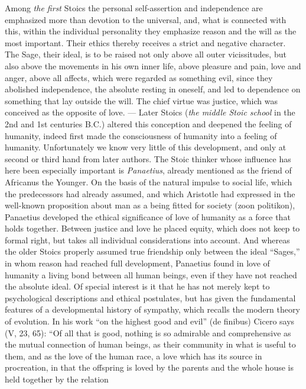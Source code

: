 \documentclass[12pt,a4paper,openany]{book}
\newcommand{\opage}[1]{\marginnote{\footnotesize\textit{[#1]}}}
\begin{document}
Among \emph{the first} Stoics the personal self-assertion
and independence are emphasized more than devotion to the universal,
and, what is connected with this, within the individual
personality they emphasize reason and the will as the
most important. Their ethics thereby receives a strict and negative character.
The Sage, their ideal, is to be raised not only above all
outer vicissitudes, but also above the movements in his own
inner life, above pleasure and pain, love and anger, above all
affects, which were regarded as something evil, since they abolished
independence, the absolute resting in oneself, and led
to dependence on something that lay outside the will.
The chief virtue was justice, which was conceived as the opposite of
love. --- Later Stoics (\emph{the middle Stoic school}
in the 2nd and 1st centuries B.C.) altered this conception and
deepened the feeling of humanity, indeed first made
the consciousness of humanity into a feeling of humanity. Unfortunately
\opage{170}we know very little of this development, and only at second
or third hand from later authors. The Stoic thinker
whose influence has here been especially important is
\emph{Panaetius}, already mentioned as the friend of Africanus the Younger.
On the basis of the natural impulse to social life, which the
predecessors had already assumed, and which Aristotle had expressed
in the well-known proposition about man as a being
fitted for society (zoon politikon), Panaetius developed the ethical
significance of love of humanity as a force that holds together.
Between justice and love he placed
equity, which does not keep to formal right, but
takes all individual considerations into account. And whereas
the older Stoics properly assumed true
friendship only between the ideal ``Sages,'' in whom reason had
reached full development, Panaetius found in
love of humanity a living bond between all human beings, even if they
have not reached the absolute ideal. Of special interest is
it that he has not merely kept to psychological descriptions
and ethical postulates, but has given the fundamental features of a
developmental history of sympathy, which recalls the modern
theory of evolution. In his work ``on the highest good and evil'' (de finibus)
Cicero says (V, 23, 65): ``Of all that is good, nothing is so
admirable and comprehensive as the mutual
connection of human beings, as their community in what is useful to them, and
as the love of the human race, a love which
has its source in procreation, in that the offspring is loved by
the parents and the whole house is held together by the relation
\end{document}

